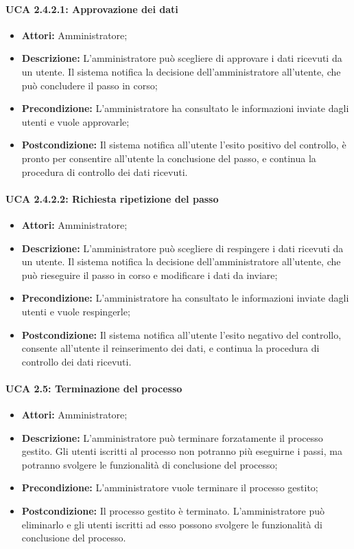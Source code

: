 \paragraph{UCA 2.4.2.1: Approvazione dei dati}
\begin{itemize}
\item \textbf{Attori:}
 Amministratore;
\item \textbf{Descrizione:} 
L'amministratore può scegliere di approvare i dati ricevuti da un utente. Il sistema notifica la decisione dell'amministratore all'utente, che può concludere il passo in corso;
\item \textbf{Precondizione:} 
L'amministratore ha consultato le informazioni inviate dagli utenti e vuole approvarle;
\item \textbf{Postcondizione:} 
Il sistema notifica all'utente l'esito positivo del controllo, è pronto per consentire all'utente la conclusione del passo, e continua la procedura di controllo dei dati ricevuti.
\end{itemize}

\paragraph{UCA 2.4.2.2: Richiesta ripetizione del passo}
\begin{itemize}
\item \textbf{Attori:}
 Amministratore;
\item \textbf{Descrizione:} 
L'amministratore può scegliere di respingere i dati ricevuti da un utente. Il sistema notifica la decisione dell'amministratore all'utente, che può rieseguire il passo in corso e modificare i dati da inviare;
\item \textbf{Precondizione:} 
L'amministratore ha consultato le informazioni inviate dagli utenti e vuole respingerle;
\item \textbf{Postcondizione:} 
Il sistema notifica all'utente l'esito negativo del controllo, consente all'utente il reinserimento dei dati, e continua la procedura di controllo dei dati ricevuti.
\end{itemize}

\paragraph{UCA 2.5: Terminazione del processo}
\begin{itemize}
\item \textbf{Attori:} Amministratore;
\item \textbf{Descrizione:} 
L'amministratore può terminare forzatamente il processo gestito. Gli utenti iscritti al processo non potranno più eseguirne i passi, ma potranno svolgere le funzionalità di conclusione del processo; 
\item \textbf{Precondizione:} 
L'amministratore vuole terminare il processo gestito;
\item \textbf{Postcondizione:} 
Il processo gestito è terminato. L'amministratore può eliminarlo e gli utenti iscritti ad esso possono svolgere le funzionalità di conclusione del processo.
\end{itemize}

